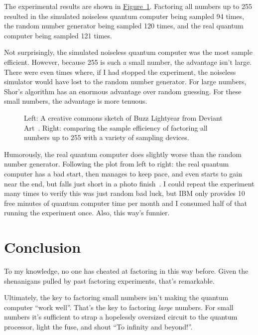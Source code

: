 \documentclass{article}
\newcommand{\fig}[1]{\hyperref[fig:#1]{Figure~\ref*{fig:#1}}}
\begin{document}
The experimental results are shown in \fig{results}.
Factoring all numbers up to 255 resulted in the simulated noiseless quantum computer being sampled 94 times, the random number generator being sampled 120 times, and the real quantum computer being sampled 121 times.

Not surprisingly, the simulated noiseless quantum computer was the most sample efficient.
However, because 255 is such a small number, the advantage isn't large.
There were even times where, if I had stopped the experiment, the noiseless simulator would have lost to the random number generator.
For large numbers, Shor's algorithm has an enormous advantage over random guessing.
For these small numbers, the advantage is more tenuous.

\begin{figure}
    \centering
    \caption{
        Left: A creative commons sketch of Buzz Lightyear from Deviant Art~\cite{buzzsketch}.
        Right: comparing the sample efficiency of factoring all numbers up to 255 with a variety of sampling devices.
    }
    \label{fig:results}
\end{figure}

Humorously, the real quantum computer does slightly worse than the random number generator.
Following the plot from left to right: the real quantum computer has a bad start, then manages to keep pace, and even starts to gain near the end, but falls just short in a photo finish~\cite{xkcdsports}.
I could repeat the experiment many times to verify this was just random bad luck, but IBM only provides 10 free minutes of quantum computer time per month and I consumed half of that running the experiment once.
Also, this way's funnier.


\section{Conclusion}

To my knowledge, no one has cheated at factoring in this way before.
Given the shenanigans pulled by past factoring experiments, that's remarkable.

Ultimately, the key to factoring small numbers isn't making the quantum computer ``work well''.
That's the key to factoring \emph{large} numbers.
For small numbers it's sufficient to strap a hopelessly oversized circuit to the quantum processor, light the fuse, and shout ``To infinity and beyond!''.

\printbibliography
\end{document}
